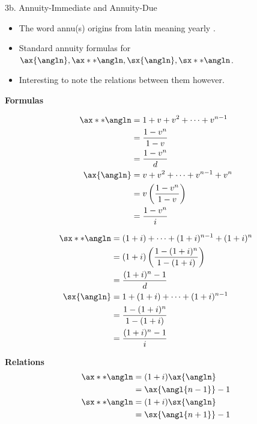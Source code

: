 \begin{CHPT_SUMM_AUTO}[label = {L.-3b}]{3b. Annuity-Immediate and Annuity-Due}
	\begin{itemize}[leftmargin = *]
		\item	The word annu(s) origins from latin meaning \og yearly \fg{}.
		\item	Standard annuity formulas for $\ax{\angln}, \ax**{\angln}, \sx{\angln}, \sx**{\angln}$.
		\item	Interesting to note the relations between them however.
	\end{itemize}
\setlength{\mathindent}{-1cm}

\textbf{Formulas}
	\begin{minipage}[ht]{0.4\linewidth}
	\begin{align*}
	\ax**{\angln}	
	&=	1 + v + v^{2} + \dots + v^{n - 1}	\\
	&=	\frac{1 - v^{n}}{1 - v}	\\
	&=	\frac{1 - v^{n}}{d}	\\
	\ax{\angln}	
	&=	v + v^{2} + \dots + v^{n - 1} + v^{n}	\\
	&=	v\left(\frac{1 - v^{n}}{1 - v}\right)	\\
	&=	\frac{1 - v^{n}}{i}	
	\end{align*}	
	\end{minipage}
	\begin{minipage}[ht]{0.6\linewidth}
		\begin{align*}
	\sx**{\angln}	
	&=	(1 + i) + \dots + (1 + i)^{n - 1} + (1 + i)^{n}	\\	
	&=	(1 + i)\left(\frac{1 - (1 + i)^{n}}{1 - (1 + i)}\right)	\\
	&=	\frac{(1 + i)^{n} - 1}{d}	\\
	\sx{\angln}	
	&=	1 + (1 + i) + \dots + (1 + i)^{n - 1}	\\
	&=	\frac{1 - (1 + i)^{n}}{1 - (1 + i)}	\\
	&=	\frac{(1 + i)^{n} - 1}{i}	
	\end{align*}
	\end{minipage}

\textbf{Relations}
	\begin{align*}
	\ax**{\angln}	
	&=	(1 + i) \ax{\angln}	\\
	&=	\ax{\angl{n - 1}} - 1	\\
	\sx**{\angln}	
	&=	(1 + i) \sx{\angln}	\\
	&=	\sx{\angl{n + 1}} - 1	
	\end{align*}
	\setlength{\mathindent}{1cm}
\end{CHPT_SUMM_AUTO}

